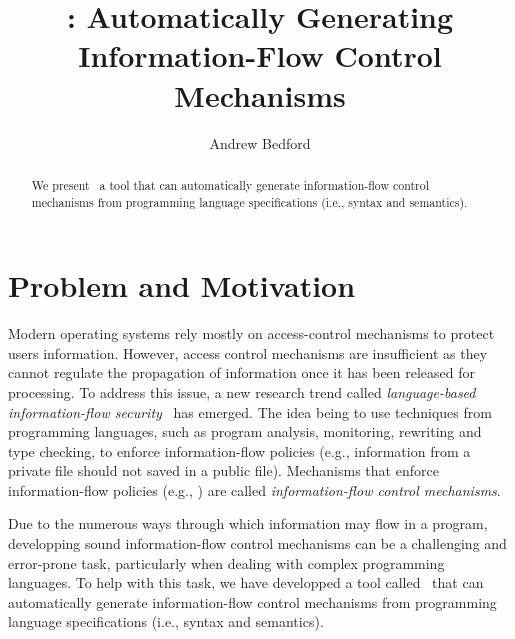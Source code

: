 \documentclass[sigplan,10pt]{acmart}\settopmatter{printfolios=true,printccs=false,printacmref=false}
\begin{document}
\title[ott-ifc]{\ottifc: Automatically Generating Information-Flow Control Mechanisms}


\author{Andrew Bedford}


\begin{abstract}
We present \ottifc\, a tool that can automatically generate information-flow control mechanisms from programming language specifications (i.e., syntax and semantics).
\end{abstract}

\maketitle

\section{Problem and Motivation}
Modern operating systems rely mostly on access-control mechanisms to protect users information. However, access control mechanisms are insufficient as they cannot regulate the propagation of information once it has been released for processing. To address this issue, a new research trend called \emph{language-based information-flow security}~\cite{DBLP:journals/jsac/SabelfeldM03} has emerged. The idea being to use techniques from programming languages, such as program analysis, monitoring, rewriting and type checking, to enforce information-flow policies (e.g., information from a private file should not saved in a public file). Mechanisms that enforce information-flow policies (e.g., \cite{DBLP:journals/compsec/BedfordCDKT17}) are called \emph{information-flow control mechanisms}. 

Due to the numerous ways through which information may flow in a program, developping sound information-flow control mechanisms can be a challenging and error-prone task, particularly when dealing with complex programming languages. To help with this task, we have developped a tool called \ottifc\ that can automatically generate information-flow control mechanisms from programming language specifications (i.e., syntax and semantics).
\end{document}
